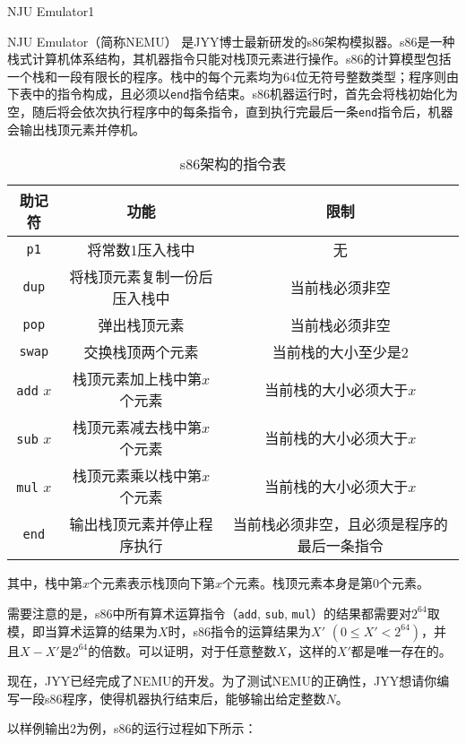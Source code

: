 \begin{Problem}{NJU Emulator}{1}

NJU Emulator（简称NEMU） 是JYY博士最新研发的s86架构模拟器。s86是一种栈式计算机体系结构，其机器指令只能对栈顶元素进行操作。s86的计算模型包括一个栈和一段有限长的程序。栈中的每个元素均为64位无符号整数类型；程序则由下表中的指令构成，且必须以\texttt{end}指令结束。s86机器运行时，首先会将栈初始化为空，随后将会依次执行程序中的每条指令，直到执行完最后一条\texttt{end}指令后，机器会输出栈顶元素并停机。

\begin{table}[htbp]
\centering
\begin{tabular}{ccc}
\hline
助记符 & 功能 & 限制  \\ \hline
\texttt{p1} & 将常数1压入栈中 & 无 \\ 
\texttt{dup} & 将栈顶元素复制一份后压入栈中 & 当前栈必须非空 \\
\texttt{pop} & 弹出栈顶元素 & 当前栈必须非空 \\
\texttt{swap} & 交换栈顶两个元素 & 当前栈的大小至少是2 \\ 
\texttt{add} $x$ & 栈顶元素加上栈中第$x$个元素 & 当前栈的大小必须大于$x$ \\ 
\texttt{sub} $x$ & 栈顶元素减去栈中第$x$个元素 & 当前栈的大小必须大于$x$ \\
\texttt{mul} $x$ & 栈顶元素乘以栈中第$x$个元素 & 当前栈的大小必须大于$x$ \\
\texttt{end} & 输出栈顶元素并停止程序执行 & 当前栈必须非空，且必须是程序的最后一条指令 \\ \hline
\end{tabular}
\caption{s86架构的指令表}
\end{table}

其中，栈中第$x$个元素表示栈顶向下第$x$个元素。栈顶元素本身是第0个元素。

需要注意的是，s86中所有算术运算指令（\texttt{add}, \texttt{sub}, \texttt{mul}）的结果都需要对$2^{64}$取模，即当算术运算的结果为$X$时，s86指令的运算结果为$X'$ $(0 \leq X' < 2^{64})$，并且$X - X'$是$2^{64}$的倍数。可以证明，对于任意整数$X$，这样的$X'$都是唯一存在的。

现在，JYY已经完成了NEMU的开发。为了测试NEMU的正确性，JYY想请你编写一段s86程序，使得机器执行结束后，能够输出给定整数$N$。

以样例输出2为例，s86的运行过程如下所示：


\end{Problem}
